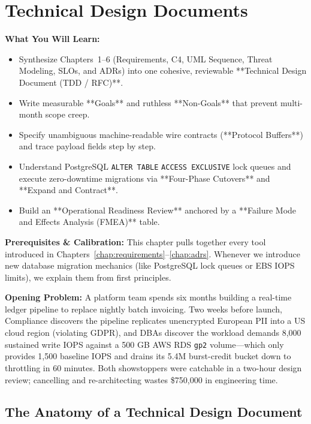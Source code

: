 \chapter{Technical Design Documents}
\label{chap:tdd}

\begin{chaptergoalsbox}
\textbf{What You Will Learn:}
\begin{itemize}[leftmargin=12pt]
  \item Synthesize Chapters~1--6 (Requirements, C4, UML Sequence, Threat Modeling, SLOs, and ADRs) into one cohesive, reviewable **Technical Design Document (TDD / RFC)**.
  \item Write measurable **Goals** and ruthless **Non-Goals** that prevent multi-month scope creep.
  \item Specify unambiguous machine-readable wire contracts (**Protocol Buffers**) and trace payload fields step by step.
  \item Understand PostgreSQL \texttt{ALTER TABLE} \texttt{ACCESS EXCLUSIVE} lock queues and execute zero-downtime migrations via **Four-Phase Cutovers** and **Expand and Contract**.
  \item Build an **Operational Readiness Review** anchored by a **Failure Mode and Effects Analysis (FMEA)** table.
\end{itemize}

\textbf{Prerequisites \& Calibration:}
This chapter pulls together every tool introduced in Chapters~\ref{chap:requirements}--\ref{chap:adrs}. Whenever we introduce new database migration mechanics (like PostgreSQL lock queues or EBS IOPS limits), we explain them from first principles.

\textbf{Opening Problem:}
A platform team spends six months building a real-time ledger pipeline to replace nightly batch invoicing. Two weeks before launch, Compliance discovers the pipeline replicates unencrypted European PII into a US cloud region (violating GDPR), and DBAs discover the workload demands 8,000 sustained write IOPS against a 500 GB AWS RDS \texttt{gp2} volume---which only provides 1,500 baseline IOPS and drains its 5.4M burst-credit bucket down to throttling in 60 minutes. Both showstoppers were catchable in a two-hour design review; cancelling and re-architecting wastes \$750,000 in engineering time.
\end{chaptergoalsbox}

\section{The Anatomy of a Technical Design Document}

